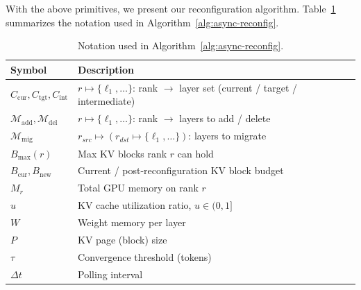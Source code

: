 \documentclass[sigplan,screen]{acmart}
\newcommand{\Ccur}{C_{\mathrm{cur}}}
\newcommand{\Ctgt}{C_{\mathrm{tgt}}}
\newcommand{\Ctmp}{C_{\mathrm{int}}}
\newcommand{\Madd}{\mathcal{M}_{\mathrm{add}}}
\newcommand{\Mdel}{\mathcal{M}_{\mathrm{del}}}
\newcommand{\Mmig}{\mathcal{M}_{\mathrm{mig}}}
\newcommand{\Bmax}{B_{\max}}
\newcommand{\Bcur}{B_{\mathrm{cur}}}
\newcommand{\Bnew}{B_{\mathrm{new}}}
\begin{document}
With the above primitives, we present our reconfiguration algorithm. Table~\ref{tab:notation} summarizes the notation used in Algorithm~\ref{alg:async-reconfig}.

\begin{table}[t]
\label{tab:notation}
\scriptsize
\caption{Notation used in Algorithm~\ref{alg:async-reconfig}.}
\centering
\begin{tabular}{@{}ll@{}}
\toprule
\textbf{Symbol} & \textbf{Description} \\
\midrule
$\Ccur,\Ctgt,\Ctmp$ & $r \mapsto \{\ell_1,\dots\}$: rank $\to$ layer set (current / target / intermediate) \\
$\Madd,\Mdel$ & $r \mapsto \{\ell_1,\dots\}$: rank $\to$ layers to add / delete \\
$\Mmig$ & $r_{src} \mapsto (r_{dst} \mapsto \{\ell_1,\dots\})$: layers to migrate \\
$\Bmax(r)$ & Max KV blocks rank $r$ can hold \\
$\Bcur,\Bnew$ & Current / post-reconfiguration KV block budget \\
$M_r$ & Total GPU memory on rank $r$ \\
$u$ & KV cache utilization ratio, $u \in (0,1]$ \\
$W$ & Weight memory per layer \\
$P$ & KV page (block) size \\
$\tau$ & Convergence threshold (tokens) \\
$\Delta t$ & Polling interval \\
\bottomrule
\end{tabular}
\end{table}
\end{document}
